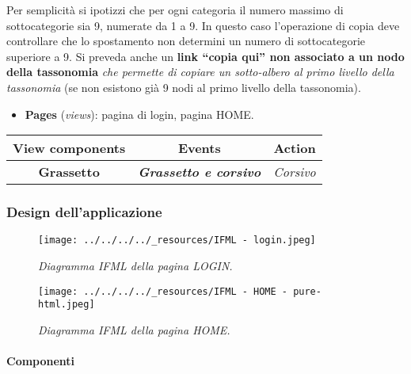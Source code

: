 Per semplicità si ipotizzi che per ogni categoria il numero massimo di
sottocategorie sia 9, numerate da 1 a 9. In questo caso l'operazione di
copia deve controllare che lo spostamento non determini un numero di
sottocategorie superiore a 9. Si preveda anche un \textbf{link ``copia
qui'' non associato a un nodo della tassonomia} \emph{che permette di
copiare un sotto-albero al primo livello della tassonomia} (se non
esistono già 9 nodi al primo livello della tassonomia).

\begin{itemize}
\tightlist
\item
  \textbf{Pages} (\emph{views}): pagina di login, pagina HOME.
\end{itemize}

\begin{longtable}[]{@{}ccc@{}}
\toprule()
View components & Events & Action \\
\midrule()
\endhead
\textbf{Grassetto} & \textbf{\emph{Grassetto e corsivo}} &
\emph{Corsivo} \\
\bottomrule()
\end{longtable}

\pagebreak

\hypertarget{design-dellapplicazione}{%
\subsubsection{Design dell'applicazione}\label{design-dellapplicazione}}

\begin{figure}
\centering
\texttt{[image: ../../../../\_resources/IFML - login.jpeg]}
\caption{\emph{Diagramma IFML della pagina LOGIN.}}
\end{figure}

\pagebreak

\begin{figure}
\centering
\texttt{[image: ../../../../\_resources/IFML - HOME - pure-html.jpeg]}
\caption{\emph{Diagramma IFML della pagina HOME.}}
\end{figure}

\pagebreak

\hypertarget{componenti}{%
\paragraph{Componenti}\label{componenti}}

